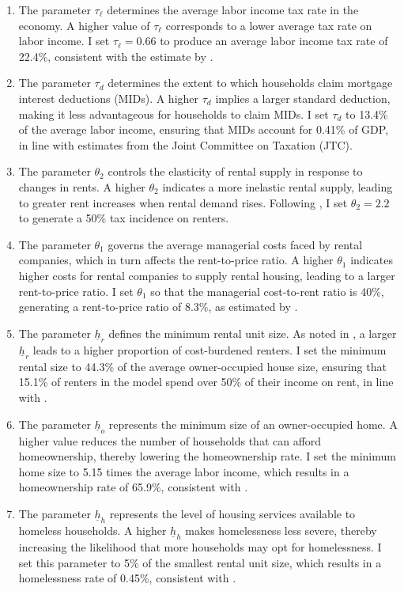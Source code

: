 \documentclass[parskip=full]{article}
\begin{document}
\begin{enumerate}
    \item The parameter $\tau_{\ell}$ determines the average labor income tax rate in the economy. A higher value of $\tau_{\ell}$ corresponds to a lower average tax rate on labor income. I set $\tau_{\ell} = 0.66$ to produce an average labor income tax rate of 22.4\%, consistent with the estimate by \citet{mcdaniel-2007}.
    \item The parameter $\tau_{d}$ determines the extent to which households claim mortgage interest deductions (MIDs). A higher $\tau_{d}$ implies a larger standard deduction, making it less advantageous for households to claim MIDs. I set $\tau_{d}$ to 13.4\% of the average labor income, ensuring that MIDs account for 0.41\% of GDP, in line with estimates from the Joint Committee on Taxation (JTC).
    \item The parameter $\theta_{2}$ controls the elasticity of rental supply in response to changes in rents. A higher $\theta_{2}$ indicates a more inelastic rental supply, leading to greater rent increases when rental demand rises. Following \citet{rs-2023}, I set $\theta_{2} = 2.2$ to generate a 50\% tax incidence on renters.
    \item The parameter $\theta_{1}$ governs the average managerial costs faced by rental companies, which in turn affects the rent-to-price ratio. A higher $\theta_{1}$ indicates higher costs for rental companies to supply rental housing, leading to a larger rent-to-price ratio. I set $\theta_{1}$ so that the managerial cost-to-rent ratio is 40\%, generating a rent-to-price ratio of 8.3\%, as estimated by \citet{gv-2009}.
    \item The parameter $\underline{h}_{r}$ defines the minimum rental unit size. As noted in \citet{rs-2023}, a larger $\underline{h}_{r}$ leads to a higher proportion of cost-burdened renters. I set the minimum rental size to 44.3\% of the average owner-occupied house size, ensuring that 15.1\% of renters in the model spend over 50\% of their income on rent, in line with \citet{rs-2023}.
    \item The parameter $\underline{h}_{o}$ represents the minimum size of an owner-occupied home. A higher value reduces the number of households that can afford homeownership, thereby lowering the homeownership rate. I set the minimum home size to 5.15 times the average labor income, which results in a homeownership rate of 65.9\%, consistent with \citet{rs-2023}.
    \item The parameter $\underline{h}_{h}$ represents the level of housing services available to homeless households. A higher $\underline{h}_{h}$ makes homelessness less severe, thereby increasing the likelihood that more households may opt for homelessness. I set this parameter to 5\% of the smallest rental unit size, which results in a homelessness rate of 0.45\%, consistent with \citet{az-2024}.
\end{enumerate}
\end{document}
